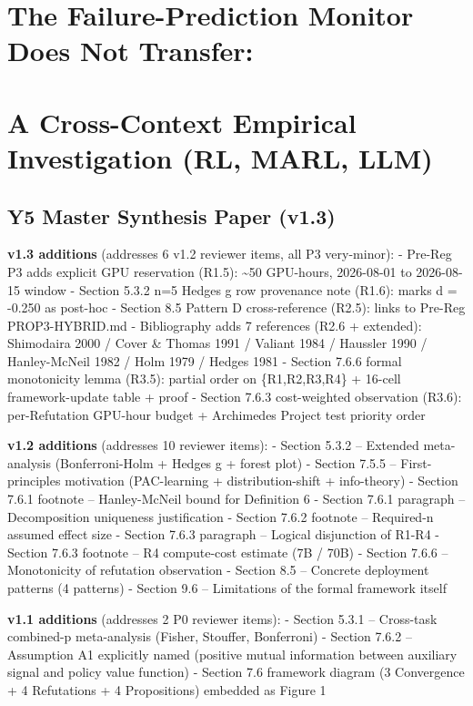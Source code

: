 \documentclass[
]{article}
\author{}
\date{}
\begin{document}
{
\setcounter{tocdepth}{3}
\tableofcontents
}
\section{The Failure-Prediction Monitor Does Not
Transfer:}\label{the-failure-prediction-monitor-does-not-transfer}

\section{A Cross-Context Empirical Investigation (RL, MARL,
LLM)}\label{a-cross-context-empirical-investigation-rl-marl-llm}

\subsection{Y5 Master Synthesis Paper
(v1.3)}\label{y5-master-synthesis-paper-v1.3}

\textbf{v1.3 additions} (addresses 6 v1.2 reviewer items, all P3
very-minor): - Pre-Reg P3 adds explicit GPU reservation (R1.5):
\textasciitilde50 GPU-hours, 2026-08-01 to 2026-08-15 window - Section
5.3.2 n=5 Hedges g row provenance note (R1.6): marks d = -0.250 as
post-hoc - Section 8.5 Pattern D cross-reference (R2.5): links to
Pre-Reg PROP3-HYBRID.md - Bibliography adds 7 references (R2.6 +
extended): Shimodaira 2000 / Cover \& Thomas 1991 / Valiant 1984 /
Haussler 1990 / Hanley-McNeil 1982 / Holm 1979 / Hedges 1981 - Section
7.6.6 formal monotonicity lemma (R3.5): partial order on \{R1,R2,R3,R4\}
+ 16-cell framework-update table + proof - Section 7.6.3 cost-weighted
observation (R3.6): per-Refutation GPU-hour budget + Archimedes Project
test priority order

\textbf{v1.2 additions} (addresses 10 reviewer items): - Section 5.3.2
-- Extended meta-analysis (Bonferroni-Holm + Hedges g + forest plot) -
Section 7.5.5 -- First-principles motivation (PAC-learning +
distribution-shift + info-theory) - Section 7.6.1 footnote --
Hanley-McNeil bound for Definition 6 - Section 7.6.1 paragraph --
Decomposition uniqueness justification - Section 7.6.2 footnote --
Required-n assumed effect size - Section 7.6.3 paragraph -- Logical
disjunction of R1-R4 - Section 7.6.3 footnote -- R4 compute-cost
estimate (7B / 70B) - Section 7.6.6 -- Monotonicity of refutation
observation - Section 8.5 -- Concrete deployment patterns (4 patterns) -
Section 9.6 -- Limitations of the formal framework itself

\textbf{v1.1 additions} (addresses 2 P0 reviewer items): - Section 5.3.1
-- Cross-task combined-p meta-analysis (Fisher, Stouffer, Bonferroni) -
Section 7.6.2 -- Assumption A1 explicitly named (positive mutual
information between auxiliary signal and policy value function) -
Section 7.6 framework diagram (3 Convergence + 4 Refutations + 4
Propositions) embedded as Figure 1
\end{document}
